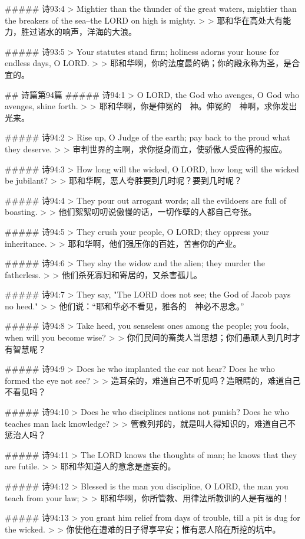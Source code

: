 ##### 诗93:4
> Mightier than the thunder of the great waters, mightier than the breakers of the sea--the LORD on high is mighty.
>
> 耶和华在高处大有能力，胜过诸水的响声，洋海的大浪。


##### 诗93:5
> Your statutes stand firm; holiness adorns your house for endless days, O LORD.
>
> 耶和华啊，你的法度最的确；你的殿永称为圣，是合宜的。


## 诗篇第94篇
##### 诗94:1
> O LORD, the God who avenges, O God who avenges, shine forth.
>
> 耶和华啊，你是伸冤的　神。伸冤的　神啊，求你发出光来。


##### 诗94:2
> Rise up, O Judge of the earth; pay back to the proud what they deserve.
>
> 审判世界的主啊，求你挺身而立，使骄傲人受应得的报应。


##### 诗94:3
> How long will the wicked, O LORD, how long will the wicked be jubilant?
>
> 耶和华啊，恶人夸胜要到几时呢？要到几时呢？


##### 诗94:4
> They pour out arrogant words; all the evildoers are full of boasting.
>
> 他们絮絮叨叨说傲慢的话，一切作孽的人都自己夸张。


##### 诗94:5
> They crush your people, O LORD; they oppress your inheritance.
>
> 耶和华啊，他们强压你的百姓，苦害你的产业。


##### 诗94:6
> They slay the widow and the alien; they murder the fatherless.
>
> 他们杀死寡妇和寄居的，又杀害孤儿。


##### 诗94:7
> They say, "The LORD does not see; the God of Jacob pays no heed."
>
> 他们说：“耶和华必不看见，雅各的　神必不思念。”


##### 诗94:8
> Take heed, you senseless ones among the people; you fools, when will you become wise?
>
> 你们民间的畜类人当思想；你们愚顽人到几时才有智慧呢？


##### 诗94:9
> Does he who implanted the ear not hear? Does he who formed the eye not see?
>
> 造耳朵的，难道自己不听见吗？造眼睛的，难道自己不看见吗？


##### 诗94:10
> Does he who disciplines nations not punish? Does he who teaches man lack knowledge?
>
> 管教列邦的，就是叫人得知识的，难道自己不惩治人吗？


##### 诗94:11
> The LORD knows the thoughts of man; he knows that they are futile.
>
> 耶和华知道人的意念是虚妄的。


##### 诗94:12
> Blessed is the man you discipline, O LORD, the man you teach from your law;
>
> 耶和华啊，你所管教、用律法所教训的人是有福的！


##### 诗94:13
> you grant him relief from days of trouble, till a pit is dug for the wicked.
>
> 你使他在遭难的日子得享平安；惟有恶人陷在所挖的坑中。


